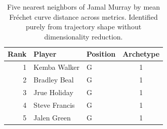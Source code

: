 \begin{table}[htbp]
  \centering\small
  \begin{tabular}{rllc}
    \toprule
    Rank & Player & Position & Archetype \\
    \midrule
    1 & Kemba Walker & G & 1 \\
    2 & Bradley Beal & G & 1 \\
    3 & Jrue Holiday & G & 1 \\
    4 & Steve Francis & G & 1 \\
    5 & Jalen Green & G & 1 \\
    \bottomrule
  \end{tabular}
  \caption{Five nearest neighbors of Jamal Murray by mean Fr\'{e}chet curve distance across metrics. Identified purely from trajectory shape without dimensionality reduction.}
  \label{tab:Jamal_Murray_frechet_curve_neighbors}
\end{table}

